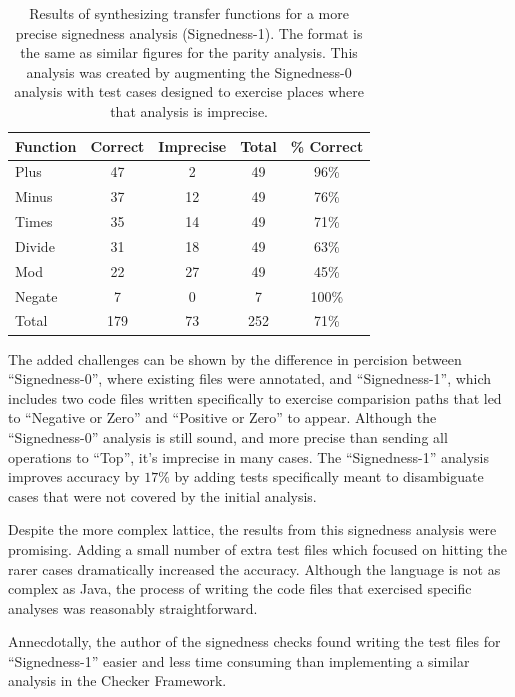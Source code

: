 \documentclass[10pt,conference]{IEEEtran}
\begin{document}
\begin{table}
\centering
 \begin{tabular}{l c c c c }
  
  Function & Correct & Imprecise & Total & \% Correct\\ 
  \midrule
  Plus & 47 & 2 & 49 & 96\% \\
  Minus & 37 & 12 & 49 & 76\% \\
  Times & 35 & 14 & 49 & 71\% \\
  Divide & 31 & 18 & 49 & 63\% \\
  Mod & 22 & 27 & 49 & 45\% \\
  Negate & 7 & 0 & 7 & 100\% \\
  \midrule
  Total & 179 & 73 & 252 & 71\% \\
 \end{tabular}
 \caption{Results of synthesizing transfer functions
 for a more precise signedness analysis (Signedness-1). The format is the same
 as similar figures for the parity analysis. This analysis was
 created by augmenting the Signedness-0 analysis with test cases
 designed to exercise places where that analysis is imprecise.}
 \label{tab-sign1}
\end{table}

The added challenges can be shown by the difference in percision
between ``Signedness-0'', where existing files were annotated, and
``Signedness-1'', which includes two code files written specifically to
exercise comparision paths that led to ``Negative or Zero'' and
``Positive or Zero'' to appear.  Although the ``Signedness-0'' analysis
is still sound, and more precise than sending all operations to
``Top'', it's imprecise in many cases.  The ``Signedness-1'' analysis
improves accuracy by \(17\%\) by adding tests specifically meant to
disambiguate cases that were not covered by the initial analysis.

Despite the more complex lattice, the results from this signedness
analysis were promising.  Adding a small number of extra test files
which focused on hitting the rarer cases dramatically increased the
accuracy.  Although the language is not as complex as Java, the
process of writing the code files that exercised specific analyses was
reasonably straightforward.

Annecdotally, the author of the signedness checks found writing the
test files for ``Signedness-1'' easier and less time consuming than
implementing a similar analysis in the Checker
Framework.
\end{document}

